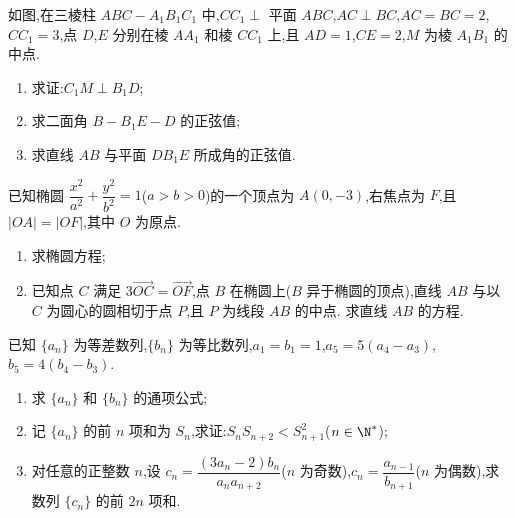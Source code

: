 \begin{problem}
如图,在三棱柱 \(ABC-A_1B_1C_1\) 中,\(CC_1\perp\) 平面 \(ABC\),\(AC\perp BC\),\(AC=BC=2\),\(CC_1=3\),点 \(D\),\(E\) 分别在棱 \(AA_1\) 和棱 \(CC_1\) 上,且 \(AD=1\),\(CE=2\),\(M\) 为棱 \(A_1B_1\) 的中点.



\begin{enumerate}
\item 求证:\(C_1M\perp B_1D\);
\item 求二面角 \(B-B_1E-D\) 的正弦值;
\item 求直线 \(AB\) 与平面 \(DB_1E\) 所成角的正弦值.
\end{enumerate}

\end{problem}

\begin{problem}
已知椭圆 \(\dfrac{x^2}{a^2}+\dfrac{y^2}{b^2}=1\)(\(a>b>0\))的一个顶点为 \(A(0,-3)\),右焦点为 \(F\),且 \(|OA|=|OF|\),其中 \(O\) 为原点.

\begin{enumerate}
\item 求椭圆方程;
\item 已知点 \(C\) 满足 \(3\overrightarrow{OC}=\overrightarrow{OF}\),点 \(B\) 在椭圆上(\(B\) 异于椭圆的顶点),直线 \(AB\) 与以 \(C\) 为圆心的圆相切于点 \(P\),且 \(P\) 为线段 \(AB\) 的中点. 求直线 \(AB\) 的方程.
\end{enumerate}
\end{problem}

\begin{problem}
已知 \(\{a_n\}\) 为等差数列,\(\{b_n\}\) 为等比数列,\(a_1=b_1=1\),\(a_5=5\left( a_4-a_3 \right)\),\(b_5=4\left( b_4-b_3 \right)\).

\begin{enumerate}
\item 求 \(\{a_n\}\) 和 \(\{b_n\}\) 的通项公式;
\item 记 \(\{a_n\}\) 的前 \(n\) 项和为 \(S_n\),求证:\(S_nS_{n+2}<S_{n+1}^2\)(\(n\in\N^*\));
\item 对任意的正整数 \(n\),设 \(c_n=\dfrac{(3a_n-2)b_n}{a_na_{n+2}}\)(\(n\) 为奇数),\(c_n=\dfrac{a_{n-1}}{b_{n+1}}\)(\(n\) 为偶数),求数列 \(\{c_n\}\) 的前 \(2n\) 项和.
\end{enumerate}
\end{problem}

